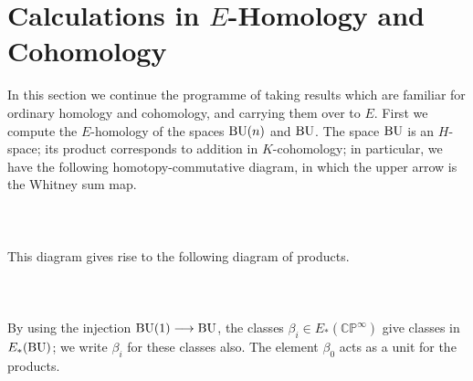 \documentclass[../main]{subfiles}
\begin{document}
\label{sec:p2c4}
\renewcommand{\labelenumi}{(\roman{enumi})}

\chapter{Calculations in $E$-Homology and Cohomology}


In this section we continue the programme of taking results which are familiar for ordinary homology and cohomology, and carrying them over to $E$. First we compute the $E$-homology of the spaces $\mathrm{BU}(n)$ and $\mathrm{BU}$. The space $\mathrm{BU}$ is an $H$-space; its product corresponds to addition in $K$-cohomology; in particular, we have the following homotopy-commutative diagram, in which the upper arrow is the Whitney sum map.
~\\~\\
~\\~\\
This diagram gives rise to the following diagram of products.
~\\~\\
~\\~\\
By using the injection $\mathrm{BU}(1)\longrightarrow \mathrm{BU}$, the classes $\beta_i\in E_\ast(\mathbb{CP}^\infty)$ give classes in $E_\ast(\mathrm{BU})$; we write $\beta_i$ for these classes also. The element $\beta_0$ acts as a unit for the products.
\end{document}
